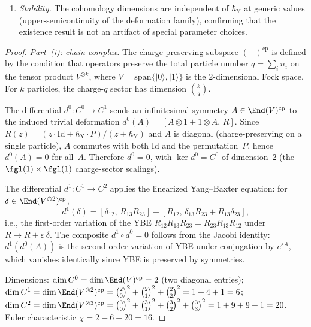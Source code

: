 \begin{proposition}
\begin{enumerate}[label=\textup{(\roman*)}]
 \item \emph{Stability.} The cohomology dimensions are independent of $\hbar_{\mathrm{Y}}$ at generic values (upper-semicontinuity of the deformation family), confirming that the existence result is not an artifact of special parameter choices.
\end{enumerate}
\end{proposition}

\begin{proof}
\emph{Part~(i): chain complex.} The charge-preserving subspace $(-)^{\mathrm{cp}}$ is defined by the condition that operators preserve the total particle number $q = \sum_i n_i$ on the tensor product $V^{\otimes k}$, where $V = \mathrm{span}\{|0\rangle, |1\rangle\}$ is the $2$-dimensional Fock space. For $k$ particles, the charge-$q$ sector has dimension $\binom{k}{q}$.

The differential $d^0 \colon C^0 \to C^1$ sends an infinitesimal symmetry $A \in \End(V)^{\mathrm{cp}}$ to the induced trivial deformation $d^0(A) = [A \otimes 1 + 1 \otimes A,\, R]$. Since $R(z) = (z \cdot \mathrm{Id} + \hbar_{\mathrm{Y}} \cdot P)/(z + \hbar_{\mathrm{Y}})$ and $A$ is diagonal (charge-preserving on a single particle), $A$ commutes with both $\mathrm{Id}$ and the permutation~$P$, hence $d^0(A) = 0$ for all~$A$. Therefore $d^0 = 0$, with $\ker d^0 = C^0$ of dimension~$2$ (the $\fgl(1) \times \fgl(1)$ charge-sector scalings).

The differential $d^1 \colon C^1 \to C^2$ applies the linearized Yang--Baxter equation: for $\delta \in \End(V^{\otimes 2})^{\mathrm{cp}}$,
\[
 d^1(\delta) = [\delta_{12},\, R_{13} R_{23}] + [R_{12},\, \delta_{13} R_{23} + R_{13} \delta_{23}],
\]
i.e., the first-order variation of the YBE $R_{12}R_{13}R_{23} = R_{23}R_{13}R_{12}$ under $R \mapsto R + \varepsilon\,\delta$. The composite $d^1 \circ d^0 = 0$ follows from the Jacobi identity: $d^1(d^0(A))$ is the second-order variation of YBE under conjugation by $e^{\varepsilon A}$, which vanishes identically since YBE is preserved by symmetries.

Dimensions: $\dim C^0 = \dim \End(V)^{\mathrm{cp}} = 2$ (two diagonal entries); $\dim C^1 = \dim \End(V^{\otimes 2})^{\mathrm{cp}} = \binom{2}{0}^2 + \binom{2}{1}^2 + \binom{2}{2}^2 = 1 + 4 + 1 = 6$; $\dim C^2 = \dim \End(V^{\otimes 3})^{\mathrm{cp}} = \binom{3}{0}^2 + \binom{3}{1}^2 + \binom{3}{2}^2 + \binom{3}{3}^2 = 1 + 9 + 9 + 1 = 20$. Euler characteristic $\chi = 2 - 6 + 20 = 16$.


\end{proof}
